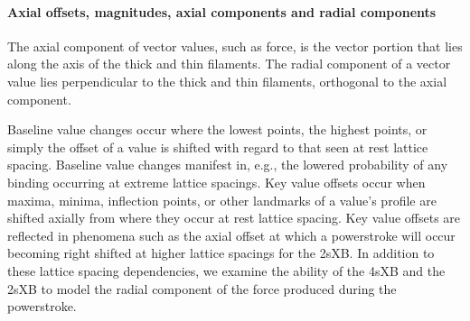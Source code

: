 \documentclass[]{article}
\begin{document}
\paragraph{Axial offsets, magnitudes, axial components and radial components} %
The axial component of vector values, such as force, is the vector portion that lies along the axis of the thick and thin filaments.
The radial component of a vector value lies perpendicular to the thick and thin filaments, orthogonal to the axial component.

Baseline value changes occur where the lowest points, the highest points, or simply the offset of a value is shifted with regard to that seen at rest lattice spacing.
Baseline value changes manifest in, e.g., the lowered probability of any binding occurring at extreme lattice spacings. 
Key value offsets occur when maxima, minima, inflection points, or other landmarks of a value's profile are shifted axially from where they occur at rest lattice spacing.
Key value offsets are reflected in phenomena such as the axial offset at which a powerstroke will occur becoming right shifted at higher lattice spacings for the 2sXB.
In addition to these lattice spacing dependencies, we examine the ability of the 4sXB and the 2sXB to model the radial component of the force produced during the powerstroke.
\end{document}
